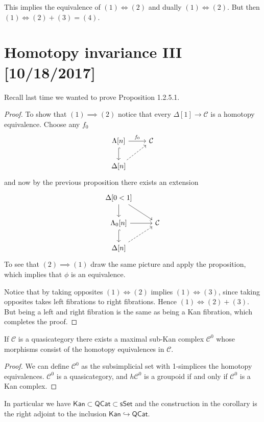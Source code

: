 \documentclass{amsart}
\begin{document}
This implies the equivalence of $(1)\iff (2)$ and dually $(1)\iff (2)$. But
then $(1)\iff (2)+(3)=(4)$.

\newpage

\section{Homotopy invariance III [10/18/2017]}

Recall last time we wanted to prove Proposition 1.2.5.1.
\begin{proof}
    To show that $(1)\implies(2)$ notice that every $\Delta[1]\to\mathcal{C}$ is a homotopy equivalence.
    Choose any $f_0$
    \begin{equation*}
        \begin{tikzcd}
            \Lambda[n] \rar{f_0}\dar[hook] & \mathcal{C} \\
            \Delta[n]\ar[ur, dashed] 
        \end{tikzcd}
    \end{equation*}
    and now by the previous proposition there exists an extension
    \begin{equation*}
        \begin{tikzcd}
            \Delta[0<1] \ar{rd}\dar \\
            \Lambda_0[n] \rar\dar[hook] & \mathcal{C} \\
            \Delta[n]\ar[ur,dashed]{f}
        \end{tikzcd}
    \end{equation*}
    To see that $(2)\implies(1)$ draw the same picture and apply the proposition,
    which implies that $\phi$ is an equivalence.

    Notice that by taking opposites $(1)\iff(2)$ implies $(1)\iff(3)$, since taking
    opposites takes left fibrations to right fibrations. Hence $(1)\iff (2)+(3)$.
    But being a left and right fibration is the same as being a Kan fibration, which
    completes the proof.
\end{proof}

\begin{corollary}
    If $\mathcal{C}$ is a quasicategory there exists a maximal sub-Kan complex
    $\mathcal{C}^0$ whose morphisms consist of the homotopy equivalences in $\mathcal{C}$.
\end{corollary}
\begin{proof}
    We can define $\mathcal{C}^0$ as the subsimplicial set with 1-simplices
    the homotopy equivalences. $\mathcal{C}^0$ is a quasicategory, and $h\mathcal{C}^0$
    is a groupoid if and only if $\mathcal{C}^0$ is a Kan complex.
\end{proof}
In particular we have $\mathsf{Kan}\subset \mathsf{QCat}\subset\mathsf{sSet}$
and the construction in the corollary is the right adjoint to the inclusion
$\mathsf{Kan}\hookrightarrow\mathsf{QCat}$.
\end{document}
